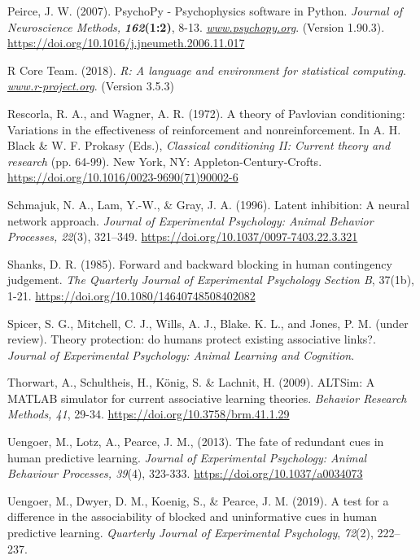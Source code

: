 \documentclass[twocolumn]{article}
\begin{document}
\begin{hangparas}{1em}{1}
Peirce, J. W. (2007). PsychoPy - Psychophysics software in Python.
\emph{\emph{Journal of Neuroscience Methods,}
}\textbf{\emph{\textbf{162}}\textbf{(1:2)}}, 8-13.
\href{http://www.psychopy.org/}{\emph{www.psychopy.org}}. (Version
1.90.3). \url{https://doi.org/10.1016/j.jneumeth.2006.11.017}

R Core Team. (2018). \emph{R: A language and environment for statistical
computing}. \href{http://www.r-project.org/}{\emph{www.r-project.org}}.
(Version 3.5.3)

Rescorla, R. A., and Wagner, A. R. (1972). A theory of Pavlovian
conditioning: Variations in the effectiveness of reinforcement and
nonreinforcement. In A. H. Black \& W. F. Prokasy (Eds.),
\emph{Classical conditioning II: Current theory and research }(pp.
64-99). New York, NY: Appleton-Century-Crofts.
\url{https://doi.org/10.1016/0023-9690(71)90002-6}

Schmajuk, N. A., Lam, Y.-W., \& Gray, J. A. (1996). Latent inhibition: A
neural network approach. \emph{\emph{Journal of Experimental Psychology:
Animal Behavior Processes, 22}}(3), 321--349.
\href{https://psycnet.apa.org/doi/10.1037/0097-7403.22.3.321}{https://doi.org/10.1037/0097-7403.22.3.321}

Shanks, D. R. (1985). Forward and backward blocking in human contingency
judgement. \emph{The Quarterly Journal of Experimental Psychology
Section B}, 37(1b), 1-21.
\url{https://doi.org/10.1080/14640748508402082}

Spicer, S. G., Mitchell, C. J., Wills, A. J., Blake. K. L., and Jones,
P. M. (under review). Theory protection: do humans protect existing
associative links?. \emph{Journal of Experimental Psychology: Animal
Learning and Cognition}.

Thorwart, A., Schultheis, H., König, S. \& Lachnit, H. (2009). ALTSim: A
MATLAB simulator for current associative learning theories.
\emph{Behavior Research Methods, 41}, 29-34.
\url{https://doi.org/10.3758/brm.41.1.29}

Uengoer, M., Lotz, A., Pearce, J. M., (2013). The fate of redundant cues
in human predictive learning. \emph{Journal of Experimental Psychology:
Animal Behaviour Processes, 39}(4), 323-333.
\url{https://doi.org/10.1037/a0034073}

Uengoer, M., Dwyer, D. M., Koenig, S., \& Pearce, J. M. (2019). A test
for a difference in the associability of blocked and uninformative cues
in human predictive learning. \emph{Quarterly Journal of Experimental
Psychology}, \emph{72}(2), 222--237.


\end{hangparas}
\end{document}
